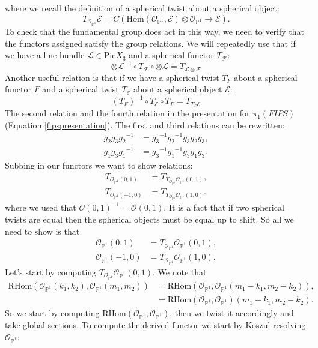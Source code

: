 \documentclass[oneside]{amsart}
\theoremstyle{definition}
\theoremstyle{definition}
\theoremstyle{definition}
\theoremstyle{definition}
\newcommand{\PP}{\mathbb{P}}
\newcommand{\Os}{\mathcal{O}}
\newcommand{\Ls}{\mathcal{L}}
\newcommand{\Es}{\mathcal{E}}
\newcommand{\Fs}{\mathcal{F}}
\begin{document}
where we recall the definition of a spherical twist about a spherical object:
\begin{equation*}
     T_{\Os_{\PP^1}}\Es =C\left(\text{Hom}(\Os_{\PP^1},\Es )\otimes \Os_{\PP^1} \to \Es  \right).
\end{equation*}
To check that the fundamental group does act in this way, we need to verify that the functors assigned satisfy the group relations. We will repeatedly use that if we have a line bundle $\Ls \in \text{Pic}X_3$ and a spherical functor $T_{\Fs}$:
$$
\otimes \Ls^{-1} \circ T_{\Fs}  \circ \otimes \Ls = T_{\Ls \otimes \Fs}
$$
Another useful relation is that if we have a spherical twist $T_{F}$ about a spherical functor $F$ and a spherical twist $T_{\Es}$ about a spherical object $\Es$:
$$
(T_F)^{-1} \circ T_{\Es} \circ T_F = T_{T_F \Es}
$$
The second relation and the fourth relation in the presentation for $\pi_1(FIPS)$ (Equation \eqref{fipspresentation}). The first and third relations can be rewritten:
\begin{align*}
    g_2 g_3 {g_2}^{-1} &= {g_3}^{-1}{g_2}^{-1}g_3 g_2 g_3,\\
    g_1 g_3 {g_1}^{-1} &= {g_3}^{-1}{g_1}^{-1}g_3 g_1 g_3.
\end{align*}
Subbing in our functors we want to show relations:
\begin{align*}
    T_{\Os_{\PP^1}(0,1)} &= T_{T_{\Os_{\PP^1}}\Os_{\PP^1}(0,1)},\\
    T_{\Os_{\PP^1}(-1,0)} &= T_{T_{\Os_{\PP^1}}\Os_{\PP^1}(1,0)}.
\end{align*}
where we used that $\Os(0,1)^{-1} = \Os(0,1)$. It is a fact that if two spherical twists are equal then the spherical objects must be equal up to shift. So all we need to show is that 
\begin{align}
    \Os_{\PP^1}(0,1)&= T_{\Os_{\PP^1}}\Os_{\PP^1}(0,1), 
    \label{rel1}\\
    \label{rel2} \Os_{\PP^1}(-1,0) &= T_{\Os_{\PP^1}}\Os_{\PP^1}(1,0).
\end{align}
Let's start by computing $T_{\Os_{\PP^1}}\Os_{\PP^1}(0,1)$. We note that 
\begin{align*}
    \text{RHom}(\Os_{\PP^1}(k_1, k_2),\Os_{\PP^1}(m_1,m_2)) &= \text{RHom}(\Os_{\PP^1},\Os_{\PP^1}(m_1 - k_1, m_2 - k_2)), \\
    &=\text{RHom}(\Os_{\PP^1},\Os_{\PP^1})(m_1 - k_1, m_2 - k_2).
\end{align*}
So we start by computing $\text{RHom}(\Os_{\PP^1},\Os_{\PP^1})$, then we twist it accordingly and take global sections. To compute the derived functor we start by Koszul resolving $\Os_{\PP^1}$:
\end{document}
